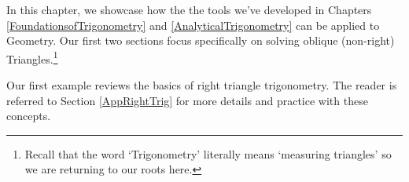 

\setcounter{footnote}{0}

\label{TheLawofSines}

In this chapter, we showcase how the the tools we've developed in Chapters \ref{FoundationsofTrigonometry} and \ref{AnalyticalTrigonometry} can be applied to Geometry.  Our first two sections focus specifically on solving oblique (non-right) Triangles.\footnote{Recall that the word `Trigonometry' literally means `measuring triangles' so we are returning to our roots here.} 

\smallskip

Our first example reviews the basics of right triangle trigonometry.  The reader is referred to Section \ref{AppRightTrig} for more details and practice with these concepts.



